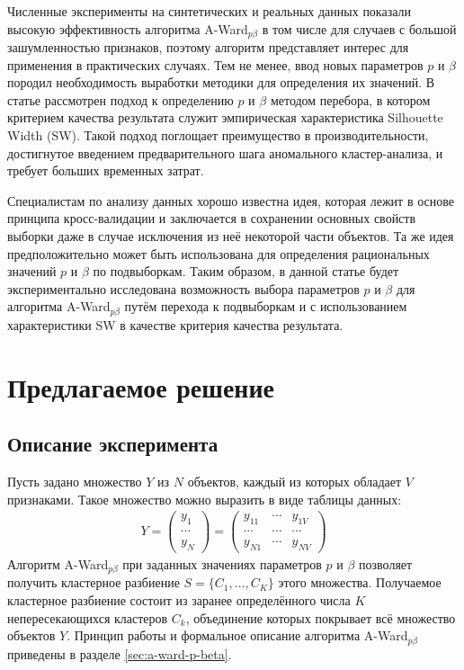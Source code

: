 \documentclass[12pt]{a&t}
\begin{document}
Численные эксперименты на синтетических и реальных данных показали высокую эффективность алгоритма \mbox{A-Ward$ _{p\beta} $} в том числе для случаев с большой зашумленностью признаков, поэтому алгоритм представляет интерес для применения в практических случаях. Тем не менее, ввод новых параметров $ p $ и $ \beta $ породил необходимость выработки методики для определения их значений. В статье \cite{SW-Based-Search} рассмотрен подход к определению $ p $ и $ \beta $ методом перебора, в котором критерием качества результата служит эмпирическая характеристика Silhouette Width (SW)\cite{SW-Canonical}. Такой подход поглощает преимущество в производительности, достигнутое введением предварительного шага аномального кластер-анализа, и требует больших временных затрат.

Специалистам по анализу данных хорошо известна идея, которая лежит в основе принципа кросс-валидации \cite{None} и заключается в сохранении основных свойств выборки даже в случае исключения из неё некоторой части объектов. Та же идея предположительно может быть использована для определения рациональных значений $ p $ и $ \beta $ по подвыборкам. Таким образом, в данной статье будет экспериментально исследована возможность выбора параметров $ p $ и $ \beta $ для алгоритма \mbox{A-Ward$ _{p\beta} $} путём перехода к подвыборкам и с использованием характеристики SW в качестве критерия качества результата.

\section{Предлагаемое решение}
\subsection{Описание эксперимента}
Пусть задано множество $ Y $ из $ N $ объектов, каждый из которых обладает $ V $ признаками. Такое множество можно выразить в виде таблицы данных:
\begin{gather} \label{eq:data-table}
	Y= \begin{pmatrix} 
	y_{1} \\
	\cdots \\ 
	y_{N} 
	\end{pmatrix}
	= \begin{pmatrix} 
		y_{11} & \cdots  & y_{1V} \\ 
		\cdots & \cdots  & \cdots \\ 
		y_{N1} & \cdots  & y_{NV} 
	\end{pmatrix}
\end{gather}
Алгоритм \mbox{A-Ward$ _{p\beta} $} при заданных значениях параметров $ p $ и $ \beta $  позволяет получить кластерное разбиение $ S=\{C_1, \ldots, C_K\} $  этого множества. Получаемое кластерное разбиение состоит из заранее определённого числа $ K $ непересекающихся кластеров $ C_k $, объединение которых покрывает всё множество объектов $ Y $. Принцип работы и формальное описание алгоритма \mbox{A-Ward$ _{p\beta} $} приведены в разделе \ref{sec:a-ward-p-beta}.
\end{document}
